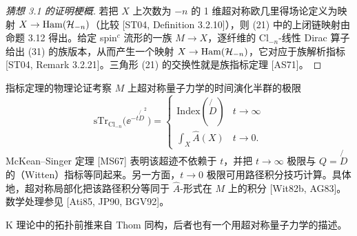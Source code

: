 \begin{proof}[猜想 3.1 的证明梗概]
若把 $X$ 上次数为 $-n$ 的 1 维超对称欧几里得场论定义为映射 $X\to\operatorname{Ham}(\mathcal{H}_{-n})$（比较 [ST04, Definition 3.2.10]），则 (21) 中的上闭链映射由命题 3.12 得出。给定 spin$^c$ 流形的一族 $M\to X$，逐纤维的 $\mathrm{Cl}_{-n}$-线性 Dirac 算子给出 (31) 的族版本，从而产生一个映射 $X\to\operatorname{Ham}(\mathcal{H}_{-n})$，它对应于族解析指标 [ST04, Remark 3.2.21]。三角形 (21) 的交换性就是族指标定理 [AS71]。
\end{proof}

\begin{remark}[3.14]
指标定理的物理论证考察 $M$ 上超对称量子力学的时间演化半群的极限
\begin{equation}
\mathrm{sTr}_{\mathrm{Cl}_{-n}}\bigl(\ee^{-t\mathord{\not{D}}^2}\bigr)=\begin{cases}\mathrm{Index}(\mathord{\not{D}}) & t\to\infty\\[6pt] \displaystyle\int_X\hat{A}(X) & t\to0.\end{cases}
\tag{32}
\end{equation}
McKean–Singer 定理 [MS67] 表明该超迹不依赖于 $t$，并把 $t\to\infty$ 极限与 $Q=\mathord{\not{D}}$ 的（Witten）指标等同起来。另一方面，$t\to0$ 极限可用路径积分技巧计算。具体地，超对称局部化把该路径积分等同于 $\hat{A}$-形式在 $M$ 上的积分 [Wit82b, AG83]。数学处理参见 [Ati85, JP90, BGV92]。
\end{remark}

K 理论中的拓扑前推来自 Thom 同构，后者也有一个用超对称量子力学的描述。

